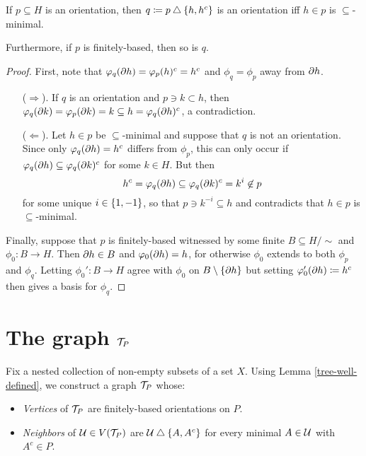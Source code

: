 \documentclass{amsart}
\begin{document}
    \begin{lemma}\label{tree-well-defined}
        If $p\subseteq H$ is an orientation, then $q\coloneqq p\bigtriangleup\left\{h,h^c\right\}$ is an orientation iff $h\in p$ is $\subseteq$-minimal.

        Furthermore, if $p$ is finitely-based, then so is $q$.
    \end{lemma}
    \begin{proof}
        First, note that $\varphi_q(\partial h)=\varphi_p(h)^c=h^c$ and $\phi_q=\phi_p$ away from $\partial h$.
        \begin{itemize}
            \item[($\Rightarrow$).] If $q$ is an orientation and $p\ni k\subset h$, then $\varphi_q(\partial k)=\varphi_p(\partial k)=k\subseteq h=\varphi_q(\partial h)^c$, a contradiction.
            \item[($\Leftarrow$).] Let $h\in p$ be $\subseteq$-minimal and suppose that $q$ is not an orientation. Since only $\varphi_q(\partial h)=h^c$ differs from $\phi_p$, this can only occur if $\varphi_q(\partial h)\subseteq\varphi_q(\partial k)^c$ for some $k\in H$. But then
                \begin{equation*}
                    h^c=\varphi_q(\partial h)\subseteq\varphi_q(\partial k)^c=k^i\not\in p
                \end{equation*}
                for some unique $i\in\left\{1,-1\right\}$, so that $p\ni k^{-i}\subseteq h$ and contradicts that $h\in p$ is $\subseteq$-minimal.
        \end{itemize}
        Finally, suppose that $p$ is finitely-based witnessed by some finite $B\subseteq H/\!\sim$ and $\phi_0:B\to H$. Then $\partial h\in B$ and $\varphi_0(\partial h)=h$, for otherwise $\phi_0$ extends to both $\phi_p$ and $\phi_q$. Letting $\phi_0':B\to H$ agree with $\phi_0$ on $B\setminus\left\{\partial h\right\}$ but setting $\varphi_0'(\partial h)\coloneqq h^c$ then gives a basis for $\phi_q$.
    \end{proof}

    \section{The graph $\mathcal{T}_P$}

    Fix a nested collection of non-empty subsets of a set $X$. Using Lemma \ref{tree-well-defined}, we construct a graph $\mathcal{T}_P$ whose:
    \begin{itemize}
        \item \textit{Vertices} of $\mathcal{T}_P$ are finitely-based orientations on $P$.
        \item \textit{Neighbors} of $\mathcal{U}\in V(\mathcal{T}_P)$ are $\mathcal{U}\bigtriangleup\left\{A,A^c\right\}$ for every minimal $A\in\mathcal{U}$ with $A^c\in P$.
    \end{itemize}
\end{document}
